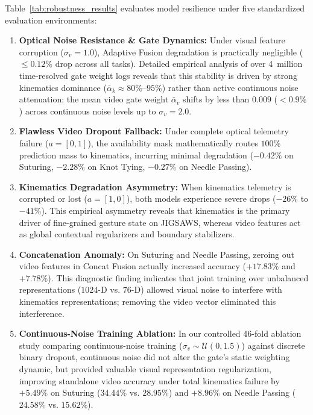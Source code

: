 \documentclass[10pt,journal]{IEEEtran}
\begin{document}
Table~\ref{tab:robustness_results} evaluates model resilience under five standardized evaluation environments:
\begin{enumerate}
    \item \textbf{Optical Noise Resistance \& Gate Dynamics:} Under visual feature corruption ($\sigma_v=1.0$), Adaptive Fusion degradation is practically negligible ($\le 0.12\%$ drop across all tasks). Detailed empirical analysis of over 4~million time-resolved gate weight logs reveals that this stability is driven by strong kinematics dominance ($\bar{\alpha}_k \approx 80\%$--$95\%$) rather than active continuous noise attenuation: the mean video gate weight $\bar{\alpha}_v$ shifts by less than $0.009$ ($<0.9\%$) across continuous noise levels up to $\sigma_v = 2.0$.
    \item \textbf{Flawless Video Dropout Fallback:} Under complete optical telemetry failure ($a=[0, 1]$), the availability mask mathematically routes $100\%$ prediction mass to kinematics, incurring minimal degradation ($-0.42\%$ on Suturing, $-2.28\%$ on Knot Tying, $-0.27\%$ on Needle Passing).
    \item \textbf{Kinematics Degradation Asymmetry:} When kinematics telemetry is corrupted or lost ($a=[1, 0]$), both models experience severe drops ($-26\%$ to $-41\%$). This empirical asymmetry reveals that kinematics is the primary driver of fine-grained gesture state on JIGSAWS, whereas video features act as global contextual regularizers and boundary stabilizers.
    \item \textbf{Concatenation Anomaly:} On Suturing and Needle Passing, zeroing out video features in Concat Fusion actually increased accuracy ($+17.83\%$ and $+7.78\%$). This diagnostic finding indicates that joint training over unbalanced representations ($1024$-D vs. $76$-D) allowed visual noise to interfere with kinematics representations; removing the video vector eliminated this interference.
    \item \textbf{Continuous-Noise Training Ablation:} In our controlled 46-fold ablation study comparing continuous-noise training ($\sigma_v \sim \mathcal{U}(0, 1.5)$) against discrete binary dropout, continuous noise did not alter the gate's static weighting dynamic, but provided valuable visual representation regularization, improving standalone video accuracy under total kinematics failure by $+5.49\%$ on Suturing ($34.44\%$ vs. $28.95\%$) and $+8.96\%$ on Needle Passing ($24.58\%$ vs. $15.62\%$).
\end{enumerate}
\end{document}
